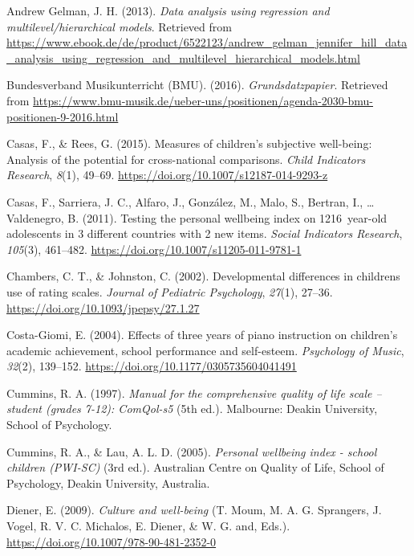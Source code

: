 \documentclass[a4, 12pt]{article}
\begin{document}
\leavevmode\hypertarget{ref-AndrewGelman2013}{}%
Andrew Gelman, J. H. (2013). \emph{Data analysis using regression and multilevel/hierarchical models}. Retrieved from \url{https://www.ebook.de/de/product/6522123/andrew_gelman_jennifer_hill_data_analysis_using_regression_and_multilevel_hierarchical_models.html}

\leavevmode\hypertarget{ref-BundesverbandMusikunterricht}{}%
Bundesverband Musikunterricht (BMU). (2016). \emph{Grundsdatzpapier}. Retrieved from \url{https://www.bmu-musik.de/ueber-uns/positionen/agenda-2030-bmu-positionen-9-2016.html}

\leavevmode\hypertarget{ref-Casas2015}{}%
Casas, F., \& Rees, G. (2015). Measures of children's subjective well-being: Analysis of the potential for cross-national comparisons. \emph{Child Indicators Research}, \emph{8}(1), 49--69. \url{https://doi.org/10.1007/s12187-014-9293-z}

\leavevmode\hypertarget{ref-Casas2011}{}%
Casas, F., Sarriera, J. C., Alfaro, J., González, M., Malo, S., Bertran, I., \ldots{} Valdenegro, B. (2011). Testing the personal wellbeing index on 1216~year-old adolescents in 3 different countries with 2 new items. \emph{Social Indicators Research}, \emph{105}(3), 461--482. \url{https://doi.org/10.1007/s11205-011-9781-1}

\leavevmode\hypertarget{ref-Johnston2002}{}%
Chambers, C. T., \& Johnston, C. (2002). Developmental differences in childrens use of rating scales. \emph{Journal of Pediatric Psychology}, \emph{27}(1), 27--36. \url{https://doi.org/10.1093/jpepsy/27.1.27}

\leavevmode\hypertarget{ref-CostaGiomi2004}{}%
Costa-Giomi, E. (2004). Effects of three years of piano instruction on children's academic achievement, school performance and self-esteem. \emph{Psychology of Music}, \emph{32}(2), 139--152. \url{https://doi.org/10.1177/0305735604041491}

\leavevmode\hypertarget{ref-Cummins1997}{}%
Cummins, R. A. (1997). \emph{Manual for the comprehensive quality of life scale -- student (grades 7-12): ComQol-s5} (5th ed.). Malbourne: Deakin University, School of Psychology.

\leavevmode\hypertarget{ref-Cummins2005}{}%
Cummins, R. A., \& Lau, A. L. D. (2005). \emph{Personal wellbeing index - school children (PWI-SC)} (3rd ed.). Australian Centre on Quality of Life, School of Psychology, Deakin University, Australia.

\leavevmode\hypertarget{ref-Diener2009}{}%
Diener, E. (2009). \emph{Culture and well-being} (T. Moum, M. A. G. Sprangers, J. Vogel, R. V. C. Michalos, E. Diener, \& W. G. and, Eds.). \url{https://doi.org/10.1007/978-90-481-2352-0}
\end{document}
